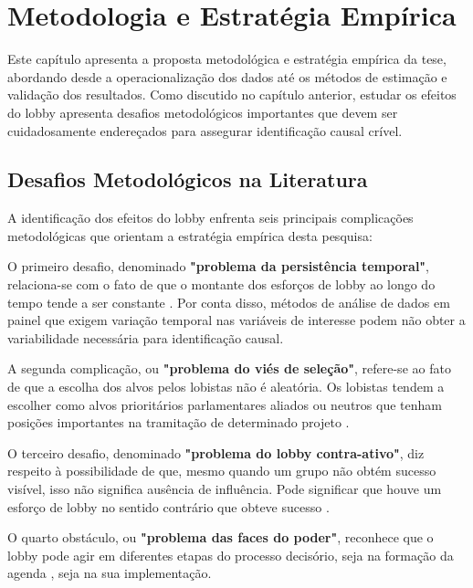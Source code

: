 \chapter{Metodologia e Estratégia Empírica}
\label{chapter:metodologia}

Este capítulo apresenta a proposta metodológica e estratégia empírica da tese, abordando desde a operacionalização dos dados até os métodos de estimação e validação dos resultados. Como discutido no capítulo anterior, estudar os efeitos do lobby apresenta desafios metodológicos importantes que devem ser cuidadosamente endereçados para assegurar identificação causal crível.

\section{Desafios Metodológicos na Literatura}

A identificação dos efeitos do lobby enfrenta seis principais complicações metodológicas que orientam a estratégia empírica desta pesquisa:

O primeiro desafio, denominado \textbf{"problema da persistência temporal"}, relaciona-se com o fato de que o montante dos esforços de lobby ao longo do tempo tende a ser constante \cite{de_figueiredo_advancing_2014}. Por conta disso, métodos de análise de dados em painel que exigem variação temporal nas variáveis de interesse podem não obter a variabilidade necessária para identificação causal.

A segunda complicação, ou \textbf{"problema do viés de seleção"}, refere-se ao fato de que a escolha dos alvos pelos lobistas não é aleatória. Os lobistas tendem a escolher como alvos prioritários parlamentares aliados \cite{kollman1998outside, caldeira2000lobbying, hojnacki2001pac} ou neutros \cite{holyoke2003choosing, kelleher2009political, bertrand2014whom, gawande2012lobbying} que tenham posições importantes na tramitação de determinado projeto \cite{marshall2010lobby}.

O terceiro desafio, denominado \textbf{"problema do lobby contra-ativo"}, diz respeito à possibilidade de que, mesmo quando um grupo não obtém sucesso visível, isso não significa ausência de influência. Pode significar que houve um esforço de lobby no sentido contrário que obteve sucesso \cite{austen1996theory}.

O quarto obstáculo, ou \textbf{"problema das faces do poder"}, reconhece que o lobby pode agir em diferentes etapas do processo decisório, seja na formação da agenda \cite{bachrach1962two}, seja na sua implementação.

